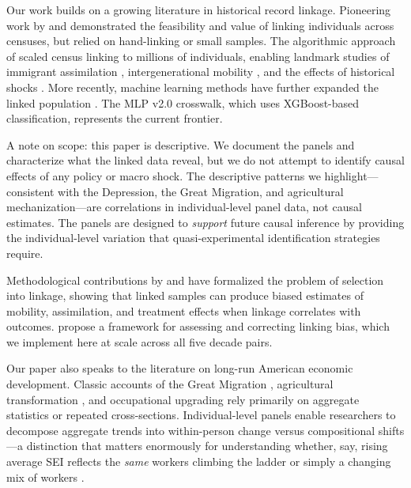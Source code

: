 \documentclass[12pt]{article}
\begin{document}
Our work builds on a growing literature in historical record linkage. Pioneering work by \citet{ferrie1996} and \citet{long2009} demonstrated the feasibility and value of linking individuals across censuses, but relied on hand-linking or small samples. The algorithmic approach of \citet{abramitzky2012, abramitzky2014} scaled census linking to millions of individuals, enabling landmark studies of immigrant assimilation \citep{abramitzky2014}, intergenerational mobility \citep{abramitzky2021}, and the effects of historical shocks \citep{hornbeck2010}. More recently, machine learning methods have further expanded the linked population \citep{helgertz2023, price2019}. The MLP v2.0 crosswalk, which uses XGBoost-based classification, represents the current frontier.

A note on scope: this paper is descriptive. We document the panels and characterize what the linked data reveal, but we do not attempt to identify causal effects of any policy or macro shock. The descriptive patterns we highlight---consistent with the Depression, the Great Migration, and agricultural mechanization---are correlations in individual-level panel data, not causal estimates. The panels are designed to \textit{support} future causal inference by providing the individual-level variation that quasi-experimental identification strategies require.

Methodological contributions by \citet{bailey2020} and \citet{abramitzky2021linking} have formalized the problem of selection into linkage, showing that linked samples can produce biased estimates of mobility, assimilation, and treatment effects when linkage correlates with outcomes. \citet{bailey2020} propose a framework for assessing and correcting linking bias, which we implement here at scale across all five decade pairs.

Our paper also speaks to the literature on long-run American economic development. Classic accounts of the Great Migration \citep{collins2000, boustan2010}, agricultural transformation \citep{goldin2000, haines2008}, and occupational upgrading \citep{katz1986, goldin2009} rely primarily on aggregate statistics or repeated cross-sections. Individual-level panels enable researchers to decompose aggregate trends into within-person change versus compositional shifts---a distinction that matters enormously for understanding whether, say, rising average SEI reflects the \textit{same} workers climbing the ladder or simply a changing mix of workers \citep{long2009, ward2020}.
\end{document}
